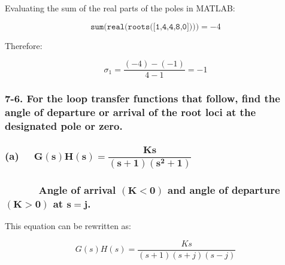 \documentclass[12pt, letterpaper]{../assignment}
\begin{document}
Evaluating the sum of the real parts of the poles in MATLAB:

$$ \texttt{sum(real(roots([1,4,4,8,0])))} = -4 $$

Therefore:

\begin{answer}
$$ \sigma_1 = \frac{(-4)-(-1) }{4-1} = -1 $$
\end{answer}

\subsubsection*{7-6. For the loop transfer functions that follow, find the angle of departure or arrival of the root loci at the designated pole or zero.}
\subsubsection*{(a) \ \  $ \mathbf{G(s)H(s) = \dfrac{K s}{(s+1)(s^2+1)}}$}
\subsubsection*{ \ \ \ \ \ \ Angle of arrival $\mathbf{(K < 0)}$ and angle of departure $ \mathbf{(K > 0)}$ at $ \mathbf{s = j}$.}

This equation can be rewritten as:

$$ G(s)H(s) = \dfrac{K s}{(s+1)(s+j)(s-j)} $$




\end{document}
